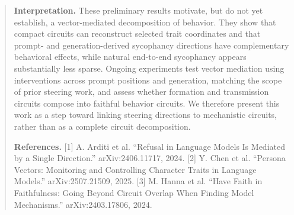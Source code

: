 \documentclass{article}
\begin{document}
\begin{abstract}
{\fontsize{10pt}{11pt}\selectfont
\noindent{}\par}
\vspace{-0.5em}

\noindent\textbf{Interpretation.}
These preliminary results motivate, but do not yet establish, a vector-mediated decomposition of behavior. They show that compact circuits can reconstruct selected trait coordinates and that prompt- and generation-derived sycophancy directions have complementary behavioral effects, while natural end-to-end sycophancy appears substantially less sparse. Ongoing experiments test vector mediation using interventions across prompt positions and generation, matching the scope of prior steering work, and assess whether formation and transmission circuits compose into faithful behavior circuits. We therefore present this work as a step toward linking steering directions to mechanistic circuits, rather than as a complete circuit decomposition.

\vspace{-0.6em}
{\fontsize{9.5pt}{10.5pt}\selectfont
\noindent\textbf{References.}
[1] A. Arditi et al. ``Refusal in Language Models Is Mediated by a Single Direction.'' arXiv:2406.11717, 2024.
[2] Y. Chen et al. ``Persona Vectors: Monitoring and Controlling Character Traits in Language Models.'' arXiv:2507.21509, 2025.
[3] M. Hanna et al. ``Have Faith in Faithfulness: Going Beyond Circuit Overlap When Finding Model Mechanisms.'' arXiv:2403.17806, 2024.
}

\end{abstract}
\end{document}
